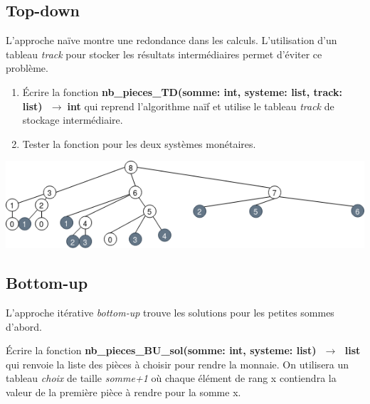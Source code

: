 \documentclass[a4paper,11pt]{article}
\begin{document}
\subsection{Top-down}
L'approche naïve montre une redondance dans les calculs. L'utilisation d'un tableau \emph{track} pour stocker les résultats intermédiaires permet d'éviter ce problème.
\begin{activite}
\begin{enumerate}
    \item Écrire la fonction \textbf{nb\_pieces\_TD(somme: int, systeme: list, track: list) $\;\rightarrow\;$int} qui reprend l'algorithme naïf et utilise le tableau \emph{track} de stockage intermédiaire.
    \item Tester la fonction pour les deux systèmes monétaires.
\end{enumerate}
\end{activite}
\begin{center}
    \centering
    \includegraphics[width=17cm]{ressources/appel-dyn-8.png}
    \label{IMG}
\end{center}
\subsection{Bottom-up}
L'approche itérative \emph{bottom-up} trouve les solutions pour les petites sommes d'abord.
\begin{center}
    
    \label{bu}
\end{center}
\begin{activite}
Écrire la fonction \textbf{nb\_pieces\_BU\_sol(somme: int, systeme: list) $\;\rightarrow\;$ list} qui renvoie la liste des pièces à choisir pour rendre la monnaie. On utilisera un tableau \emph{choix} de taille \emph{somme+1} où chaque élément de rang x contiendra la valeur de la première pièce à rendre pour la somme x.
\end{activite}
\end{document}
